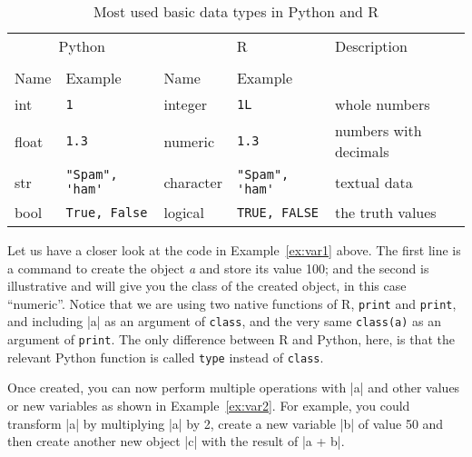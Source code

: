 
\begin{table}
  \caption{\label{tab:types}Most used basic data types in Python and R}{
  \begin{tabularx}{\textwidth}{lllll}
    \toprule
    \multicolumn{2}{c}{Python} & \multicolumn{2}{c}{R}& Description \\
    \cmidrule(lr){1-2}    \cmidrule(lr){3-4}\\
    Name & Example & Name & Example \\
    \midrule
    int   & \verb+1+             & integer   & \verb+1L+             & whole numbers \\
    float & \verb+1.3+           & numeric   & \verb+1.3+           & numbers with decimals \\
    str   & \verb+"Spam", 'ham'+ & character & \verb+"Spam", 'ham'+ & textual data  \\
    bool  & \verb+True, False+   & logical   & \verb+TRUE, FALSE+   & the truth values \\
    \bottomrule
  \end{tabularx}}{}
\end{table}
    


Let us have a closer look at the code in Example~\ref{ex:var1} above.
The first line is a command to create the object \emph{a} and store
its value 100; and the second is illustrative and will give you the
class of the created object, in this case ``numeric''. Notice that we
are using two native functions of R, \texttt{print} and \texttt{print}, and
including |a| as an argument of \texttt{class}, and the very same
\texttt{class(a)} as an argument of \texttt{print}. The only difference
between R and Python, here, is that the relevant Python function is
called \texttt{type} instead of \texttt{class}.


Once created, you can now perform multiple operations
with |a| and other values or new variables as shown in Example~\ref{ex:var2}. For example, you
could transform |a| by multiplying |a| by 2, create a new
variable |b| of value 50 and then create another new object
|c| with the result of |a + b|.





